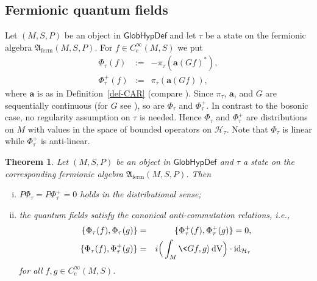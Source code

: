 \documentclass[a4paper,11pt]{amsart}
\newtheorem{thm}{Theorem}[section]
\theoremstyle{definition}
\begin{document}
\subsection{Fermionic quantum fields}

Let $(M,S,P)$ be an object in ${\mathsf{GlobHypDef}}$ and let $\tau$ be a state on the fermionic algebra ${\mathfrak{A}_\mathrm{ferm}}(M,S,P)$.
For $f\in{C^\infty_\mathrm{c}}(M,S)$ we put
\begin{eqnarray*}
\Phi_\tau(f) &:=&- \pi_\tau({\mathbf{a}}(Gf)^*),\\
\Phi_\tau^+(f)&:=&\pi_\tau({\mathbf{a}}(Gf)),
\end{eqnarray*}
where ${\mathbf{a}}$ is as in Definition~\ref{def-CAR} (compare \cite[Sec.~III.B, p.~141]{Dimock82}).
Since $\pi_\tau$, ${\mathbf{a}}$, and $G$ are sequentially continuous (for $G$ see \cite[Prop.~3.4.8]{BGP}), so are $\Phi_\tau$ and $\Phi_\tau^+$.
In contrast to the bosonic case, no regularity assumption on $\tau$ is needed.
Hence $\Phi_\tau$ and $\Phi_\tau^+$ are distributions on $M$ with values in the space of bounded operators on ${\mathcal{H}}_\tau$.
Note that $\Phi_\tau$ is linear while $\Phi_\tau^+$ is anti-linear.

\begin{thm}\label{thm:QFfermionic}
Let $(M,S,P)$ be an object in ${\mathsf{GlobHypDef}}$ and $\tau$ a state on the corresponding fermionic algebra ${\mathfrak{A}_\mathrm{ferm}}(M,S,P)$.
Then
\begin{enumerate}[(i)]
\item\label{ferm:PPsiO}
$P\Phi_\tau=P\Phi_\tau^+=0$ holds in the distributional sense;
\item\label{ferm:CARPsi}
the quantum fields satisfy the canonical anti-commutation relations, i.e., 
\begin{eqnarray*} 
\{\Phi_\tau(f),\Phi_\tau(g)\} &=& \{\Phi_\tau^+(f),\Phi_\tau^+(g)\}=0,\\
\{\Phi_\tau(f),\Phi_\tau^+(g)\} &=&i\Big(\int_M \<Gf,g{\rangle}{\,\mathrm{dV}}\Big) \cdot {\mathrm{id}}_{{\mathcal{H}}_\tau}
\end{eqnarray*}
for all $f,g\in{C^\infty_\mathrm{c}}(M,S)$.
\end{enumerate}
\end{thm}
\end{document}
